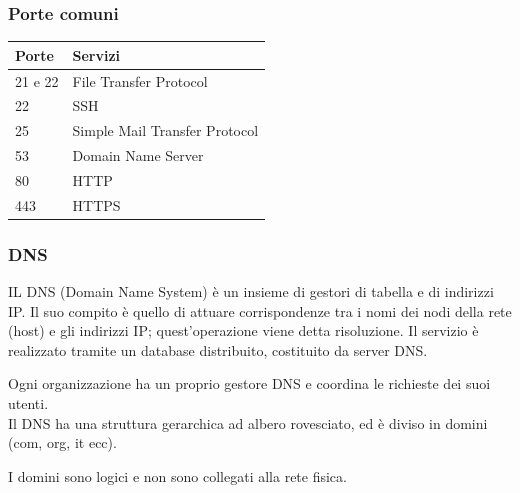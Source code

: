 \documentclass[aspectratio=169]{beamer}
\begin{document}
    \begin{frame}
        \frametitle{Porte comuni}
        \begin{table}[]
        \centering
        \begin{tabular}{|l|l|}
        \hline
         Porte &Servizi  \\ \hline
         21 e 22 &File Transfer Protocol  \\ \hline
         22 &SSH  \\ \hline
         25 &Simple Mail Transfer Protocol  \\ \hline
         53 &Domain Name Server  \\ \hline
         80 &HTTP  \\ \hline
         443 &HTTPS  \\ \hline
        \end{tabular}
        \end{table}
    \end{frame}
    
    \begin{frame}
        \frametitle{DNS}
        IL DNS (Domain Name System) è un insieme di gestori di tabella e di indirizzi IP. Il suo compito è quello di attuare corrispondenze tra i nomi dei nodi della rete (host) e gli indirizzi IP; quest'operazione viene detta risoluzione. Il servizio è realizzato tramite un database distribuito, costituito da server DNS.
        \vskip 0.3cm
    
        Ogni organizzazione ha un proprio gestore DNS e coordina le richieste dei suoi utenti.\\
       
        
        Il DNS ha una struttura gerarchica ad albero rovesciato, ed è diviso in domini (com, org, it ecc).\vskip 0.3cm
        
        I domini sono logici e non sono collegati alla rete fisica.
    \end{frame}
    
\end{document}
